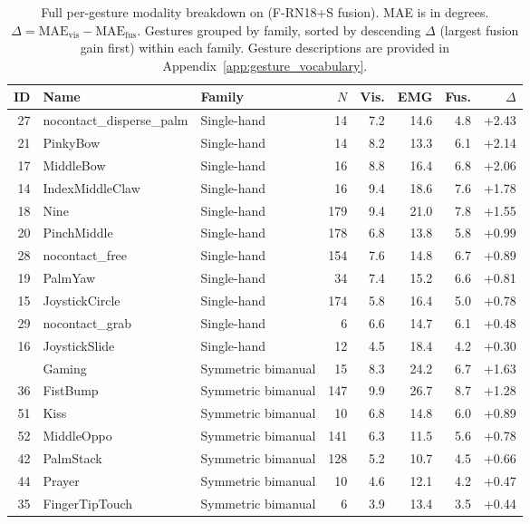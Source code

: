 \begin{table}[h]
\centering
\caption{Full per-gesture modality breakdown on \dataset{} (F-RN18+S fusion). MAE is in degrees. $\Delta = \text{MAE}_\text{vis} - \text{MAE}_\text{fus}$. Gestures grouped by family, sorted by descending $\Delta$ (largest fusion gain first) within each family. Gesture descriptions are provided in Appendix~\ref{app:gesture_vocabulary}.}
\label{tab:per_gesture_full}
\scriptsize
\setlength{\tabcolsep}{2.2pt}
\renewcommand{\arraystretch}{1.02}
\begin{tabular}{rllrrrrr}
\toprule
ID & Name & Family & $N$ & Vis. & EMG & Fus. & $\Delta$ \\
\midrule
27 & nocontact\_disperse\_palm & Single-hand & 14 & 7.2 & 14.6 & 4.8 & +2.43 \\
21 & PinkyBow & Single-hand & 14 & 8.2 & 13.3 & 6.1 & +2.14 \\
17 & MiddleBow & Single-hand & 16 & 8.8 & 16.4 & 6.8 & +2.06 \\
14 & IndexMiddleClaw & Single-hand & 16 & 9.4 & 18.6 & 7.6 & +1.78 \\
18 & Nine & Single-hand & 179 & 9.4 & 21.0 & 7.8 & +1.55 \\
20 & PinchMiddle & Single-hand & 178 & 6.8 & 13.8 & 5.8 & +0.99 \\
28 & nocontact\_free & Single-hand & 154 & 7.6 & 14.8 & 6.7 & +0.89 \\
19 & PalmYaw & Single-hand & 34 & 7.4 & 15.2 & 6.6 & +0.81 \\
15 & JoystickCircle & Single-hand & 174 & 5.8 & 16.4 & 5.0 & +0.78 \\
29 & nocontact\_grab & Single-hand & 6 & 6.6 & 14.7 & 6.1 & +0.48 \\
16 & JoystickSlide & Single-hand & 12 & 4.5 & 18.4 & 4.2 & +0.30 \\
\addlinespace[3pt]
37 & Gaming & Symmetric bimanual & 15 & 8.3 & 24.2 & 6.7 & +1.63 \\
36 & FistBump & Symmetric bimanual & 147 & 9.9 & 26.7 & 8.7 & +1.28 \\
51 & Kiss & Symmetric bimanual & 10 & 6.8 & 14.8 & 6.0 & +0.89 \\
52 & MiddleOppo & Symmetric bimanual & 141 & 6.3 & 11.5 & 5.6 & +0.78 \\
42 & PalmStack & Symmetric bimanual & 128 & 5.2 & 10.7 & 4.5 & +0.66 \\
44 & Prayer & Symmetric bimanual & 10 & 4.6 & 12.1 & 4.2 & +0.47 \\
35 & FingerTipTouch & Symmetric bimanual & 6 & 3.9 & 13.4 & 3.5 & +0.44 \\

\end{tabular}
\end{table}
